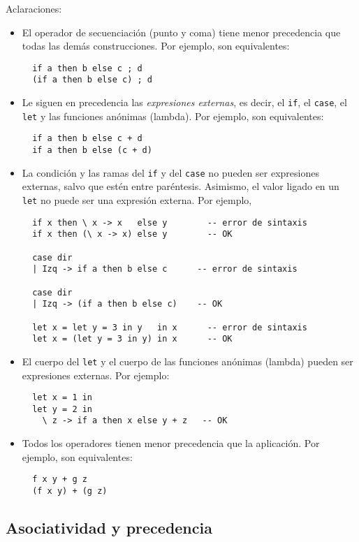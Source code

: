 \documentclass{article}
\newcommand{\fl}[1]{\texttt{#1}}
\begin{document}
Aclaraciones:
\begin{itemize}
\item El operador de secuenciación (punto y coma) tiene menor precedencia
      que todas las demás construcciones. Por ejemplo, son equivalentes:
\begin{verbatim}
  if a then b else c ; d
  (if a then b else c) ; d
\end{verbatim}
\item Le siguen en precedencia las {\em expresiones externas}, es decir,
      el \fl{if}, el \fl{case}, el \fl{let} y las funciones anónimas
      (lambda). Por ejemplo, son equivalentes:
\begin{verbatim}
  if a then b else c + d
  if a then b else (c + d)
\end{verbatim}
\item La condición y las ramas del \fl{if} y del \fl{case} no pueden
      ser expresiones externas, salvo que estén entre paréntesis.
      Asimismo, el valor ligado en un \fl{let} no puede ser una expresión
      externa.
      Por ejemplo,
\begin{verbatim}
  if x then \ x -> x   else y        -- error de sintaxis
  if x then (\ x -> x) else y        -- OK

  case dir
  | Izq -> if a then b else c      -- error de sintaxis

  case dir
  | Izq -> (if a then b else c)    -- OK

  let x = let y = 3 in y   in x      -- error de sintaxis
  let x = (let y = 3 in y) in x      -- OK
\end{verbatim}
\item El cuerpo del \fl{let} y el cuerpo de las funciones anónimas (lambda)
      pueden ser expresiones externas. Por ejemplo:
\begin{verbatim}
  let x = 1 in
  let y = 2 in
    \ z -> if a then x else y + z   -- OK
\end{verbatim}
\item Todos los operadores tienen menor precedencia que la aplicación.
Por ejemplo, son equivalentes:
\begin{verbatim}
  f x y + g z
  (f x y) + (g z)
\end{verbatim}
\end{itemize}

\subsection{Asociatividad y precedencia}
\end{document}

